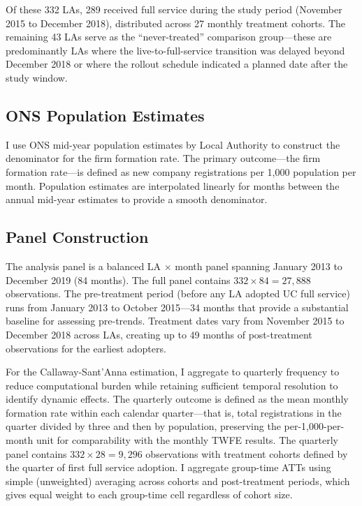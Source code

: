 \documentclass[12pt]{article}
\begin{document}
Of these 332 LAs, 289 received full service during the study period (November 2015 to December 2018), distributed across 27 monthly treatment cohorts. The remaining 43 LAs serve as the ``never-treated'' comparison group---these are predominantly LAs where the live-to-full-service transition was delayed beyond December 2018 or where the rollout schedule indicated a planned date after the study window.

\subsection{ONS Population Estimates}

I use ONS mid-year population estimates by Local Authority to construct the denominator for the firm formation rate. The primary outcome---the firm formation rate---is defined as new company registrations per 1,000 population per month. Population estimates are interpolated linearly for months between the annual mid-year estimates to provide a smooth denominator.

\subsection{Panel Construction}

The analysis panel is a balanced LA $\times$ month panel spanning January 2013 to December 2019 (84 months). The full panel contains $332 \times 84 = 27{,}888$ observations. The pre-treatment period (before any LA adopted UC full service) runs from January 2013 to October 2015---34 months that provide a substantial baseline for assessing pre-trends. Treatment dates vary from November 2015 to December 2018 across LAs, creating up to 49 months of post-treatment observations for the earliest adopters.

For the Callaway-Sant'Anna estimation, I aggregate to quarterly frequency to reduce computational burden while retaining sufficient temporal resolution to identify dynamic effects. The quarterly outcome is defined as the mean monthly formation rate within each calendar quarter---that is, total registrations in the quarter divided by three and then by population, preserving the per-1,000-per-month unit for comparability with the monthly TWFE results. The quarterly panel contains $332 \times 28 = 9{,}296$ observations with treatment cohorts defined by the quarter of first full service adoption. I aggregate group-time ATTs using simple (unweighted) averaging across cohorts and post-treatment periods, which gives equal weight to each group-time cell regardless of cohort size.
\end{document}

